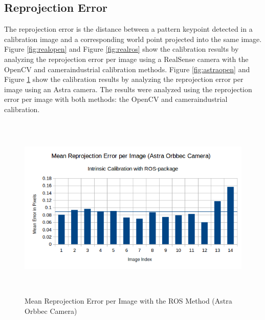 \subsection{Reprojection Error}

The reprojection error is the distance between a pattern keypoint detected in a calibration image and a corresponding world point projected into the same image. Figure \ref{fig:realopen} and Figure \ref{fig:realros} show the calibration results by analyzing the reprojection error per image using a RealSense camera with the OpenCV and camera\textunderscore industrial calibration methods. Figure \ref{fig:astraopen} and Figure \ref{fig:astraros} show the calibration results by analyzing the reprojection error per image using an Astra camera. The results were analyzed using the reprojection error per image with both methods: the OpenCV and camera\textunderscore industrial calibration.



\begin{figure}[!h]
\begin{center}
\includegraphics[width=5in, height=3.5in]{figures05/int/ros_int_cal_astra.png}
\caption{Mean Reprojection Error per Image with the ROS Method (Astra Orbbec Camera)}%
\label{fig:astraros}
\end{center}
\end{figure}


